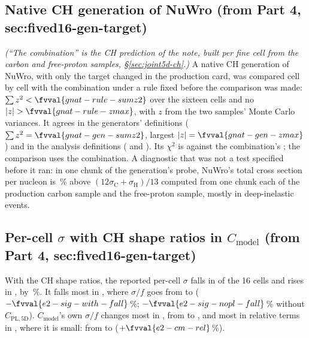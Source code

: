 \subsection{Native CH generation of NuWro (from Part 4, sec:fived16-gen-target)}
\noindent\emph{(``The combination'' is the CH prediction of the note, built per fine cell from the carbon and free-proton samples, \S\ref{sec:joint5d-ch}.)}
A native CH generation of NuWro, with only the target changed in the production card, was compared cell by cell with the combination under a rule fixed before the comparison was made: $\sum z^2<\fvval{gnat-rule-sumz2}$ over the sixteen cells and no $|z|>\fvval{gnat-rule-zmax}$, with $z$ from the two samples' Monte Carlo variances. It agrees in the generators' definitions ($\sum z^2=\fvval{gnat-gen-sumz2}$, largest $|z|=\fvval{gnat-gen-zmax}$) and in the analysis definitions ( and ). Its $\chi^2$ is  against the combination's ; the comparison uses the combination. A diagnostic that was not a test specified before it ran: in one chunk of the generation's probe, NuWro's total cross section per nucleon is \,\% above $(12\sigma_{\mathrm{C}}+\sigma_{\mathrm{H}})/13$ computed from one chunk each of the production carbon sample and the free-proton sample, mostly in deep-inelastic events.

\subsection{Per-cell $\sigma$ with CH shape ratios in $C_{\mathrm{model}}$ (from Part 4, sec:fived16-gen-target)}
With the CH shape ratios, the reported per-cell $\sigma$ falls in  of the 16 cells and rises in , by \,\%. It falls most in , where $\sigma/f$ goes from  to  ($-\fvval{e2-sig-with-fall}$\,\%; $-\fvval{e2-sig-nopl-fall}$\,\% without $C_{\mathrm{PL,5D}}$). $C_{\mathrm{model}}$'s own $\sigma/f$ changes most in , from  to , and most in relative terms in , where it is small: from  to  ($+\fvval{e2-cm-rel}$\,\%).

